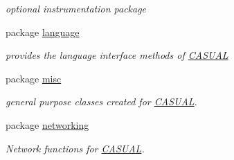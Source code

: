 \begin{DoxyCompactItemize}
\begin{DoxyCompactList}\small\item\em optional instrumentation package \end{DoxyCompactList}\item 
package \hyperlink{namespace_c_a_s_u_a_l_1_1language}{language}
\begin{DoxyCompactList}\small\item\em provides the language interface methods of \hyperlink{namespace_c_a_s_u_a_l}{C\-A\-S\-U\-A\-L} \end{DoxyCompactList}\item 
package \hyperlink{namespace_c_a_s_u_a_l_1_1misc}{misc}
\begin{DoxyCompactList}\small\item\em general purpose classes created for \hyperlink{namespace_c_a_s_u_a_l}{C\-A\-S\-U\-A\-L}. \end{DoxyCompactList}\item 
package \hyperlink{namespace_c_a_s_u_a_l_1_1networking}{networking}
\begin{DoxyCompactList}\small\item\em Network functions for \hyperlink{namespace_c_a_s_u_a_l}{C\-A\-S\-U\-A\-L}. \end{DoxyCompactList}\end{DoxyCompactItemize}
